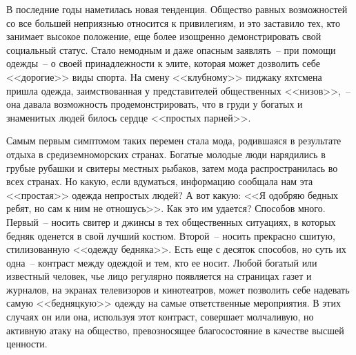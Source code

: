   В последние годы наметилась новая тенденция. Общество равных возможностей со
  все большей неприязнью относится к привилегиям, и это заставило тех, кто
  занимает высокое положение, еще более изощренно демонстрировать свой
  социальный статус. Стало немодным и даже опасным заявлять~-- при помощи
  одежды~-- о своей принадлежности к элите, которая может дозволить себе
  <<дорогие>> виды спорта. На смену <<клубному>> пиджаку яхтсмена пришла
  одежда, заимствованная у представителей общественных <<низов>>,~-- она
  давала возможность продемонстрировать, что в груди у богатых и знаменитых
  людей билось сердце <<простых парней>>.
  
  Самым первым симптомом таких перемен стала мода, родившаяся в результате
  отдыха в средиземноморских странах. Богатые молодые люди нарядились в грубые
  рубашки и свитеры местных рыбаков, затем мода распространилась во всех
  странах. Но какую, если вдуматься, информацию сообщала нам эта <<простая>>
  одежда непростых людей? А вот какую: <<Я одобряю бедных ребят, но сам к ним
  не отношусь>>. Как это им удается? Способов много. Первый~-- носить свитер и
  джинсы в тех общественных ситуациях, в которых бедняк оденется в свой лучший
  костюм. Второй~-- носить прекрасно сшитую, стилизованную <<одежду бедняка>>.
  Есть еще с десяток способов, но суть их одна~-- контраст между одеждой и тем,
  кто ее носит. Любой богатый или известный человек, чье лицо регулярно
  появляется на страницах газет и журналов, на экранах телевизоров и
  кинотеатров, может позволить себе надевать самую <<бедняцкую>> одежду на
  самые ответственные мероприятия. В этих случаях он или она, используя этот
  контраст, совершает молчаливую, но активную атаку на общество, превозносящее
  благосостояние в качестве высшей ценности.

